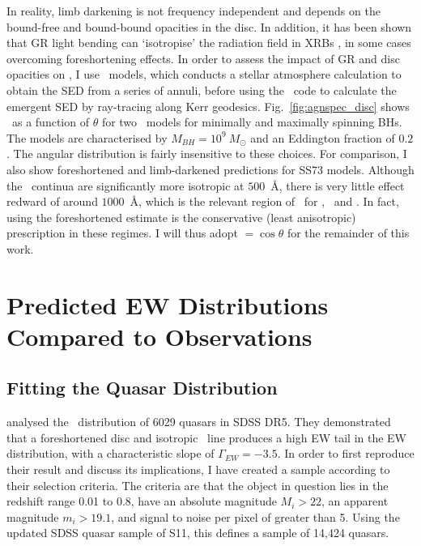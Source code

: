 \noindent
In reality, limb darkening is not frequency independent and 
depends on the bound-free and bound-bound opacities in the disc.
In addition, it has been shown that GR light bending can `isotropise' the radiation
field in XRBs \citep{zhang1997,munozdarias2013}, in some cases overcoming
foreshortening effects. In order to assess the impact of GR and disc opacities
on \ept, I use \agn\ models, which conducts a stellar atmosphere calculation
to obtain the SED from a series of annuli, before using the \kerrtrans\ code \citep{agol1997}
to calculate the emergent SED by ray-tracing along Kerr geodesics.
Fig.~\ref{fig:agnspec_disc} shows \ept\ as a function of 
$\theta$ for two \agn\ models for minimally and maximally spinning BHs. 
The models are characterised by $M_{BH}=10^9~M_\odot$ and an Eddington fraction of $0.2$.
The angular distribution is fairly insensitive to these choices.
For comparison, I also show foreshortened and limb-darkened predictions for SS73 models.
Although the \agn\ continua are significantly more isotropic at $500$~\AA,
there is very little effect redward of around $1000$~\AA, which is the relevant
region of \ept\ for \oiiifull, \civline\ and \mgline . 
In fact, using the foreshortened estimate is the conservative (least anisotropic) prescription 
in these regimes. I will thus adopt \ept$=\cos \theta$ for the remainder of this work.










\section{Predicted EW Distributions Compared to Observations}
\label{sec:mc_angular}

\subsection{Fitting the Quasar Distribution}
\label{sec:fitting}

\citet[][hereafter R11]{risaliti2011} analysed the \ewo\ 
distribution of 6029 quasars in SDSS DR5. They demonstrated
that a foreshortened disc and isotropic \oiiifull\ line produces
a high EW tail in the EW distribution, with a characteristic 
slope of $\Gamma_{EW}=-3.5$. In order to first reproduce their
result and discuss its implications, I have 
created a sample according to their selection
criteria. The criteria are that the object in question lies in the redshift
range 0.01 to 0.8, have an absolute magnitude $M_i>22$, an 
apparent magnitude $m_i>19.1$, and signal to noise per pixel of greater
than 5. Using the updated SDSS quasar sample of S11, this defines
a sample of 14,424 quasars.

